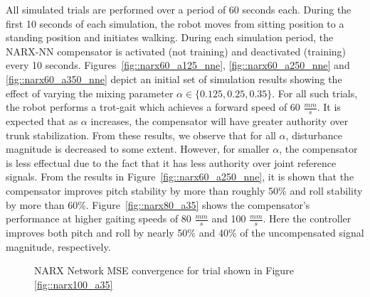 			All simulated trials are performed over a period of 60 seconds each. During the first 10 seconds of each simulation, the robot moves from sitting position to a standing position and initiates walking. During each simulation period, the NARX-NN compensator is activated (not training)  and deactivated (training)  every 10 seconds. Figures~\ref{fig::narx60_a125_nne}, \ref{fig::narx60_a250_nne} and \ref{fig::narx60_a350_nne} depict an initial set of simulation results showing the effect of varying  the mixing parameter $\alpha\in\{0.125, 0.25, 0.35\}$. For all such trials, the robot performs a trot-gait which achieves a forward speed of 60 $\frac{mm}{s}$. It is expected that as $\alpha$ increases, the compensator will have greater authority over trunk stabilization. From these results, we observe that for all $\alpha$, disturbance magnitude is decreased to some extent. However, for smaller $\alpha$, the compensator is less effectual due to the fact that it has less authority over joint reference signals.  From the results in Figure~\ref{fig::narx60_a250_nne}, it is shown that the compensator improves pitch stability by more than roughly 50\% and roll stability by more than 60\%. Figure~\ref{fig::narx80_a35} shows the compensator's performance at higher gaiting speeds of 80 $\frac{mm}{s}$ and 100 $\frac{mm}{s}$. Here the controller improves both pitch and roll by nearly 50\% and 40\% of the  uncompensated signal magnitude, respectively.
				\begin{figure}[!h]
					\centering
					\caption{NARX Network MSE convergence for trial shown in Figure \ref{fig::narx100_a35}} 
					\label{fig::narx100_a35_nne}
				\end{figure}
